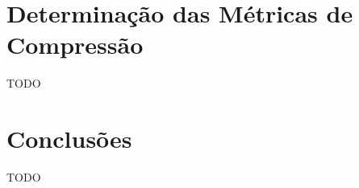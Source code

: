 


\section{Determinação das Métricas de Compressão}
\label{sec::imp-test:psnr}

TODO



\section{Conclusões}
\label{sec::imp-test:conclusao}

TODO
